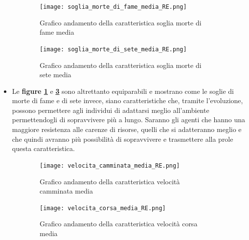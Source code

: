 \documentclass[11pt]{article}
\begin{document}
\newpage 

\begin{figure}[ht!]
	\hspace{-2mm}
	\begin{subfigure}{\textwidth}
         \centering
         \texttt{[image: soglia\_morte\_di\_fame\_media\_RE.png]}
         \caption{Grafico andamento della caratteristica soglia morte di fame media}
         \label{fig:morteFameRE}
	\end{subfigure}
	\begin{subfigure}{\textwidth}
		\centering
        \texttt{[image: soglia\_morte\_di\_sete\_media\_RE.png]}
        \caption{Grafico andamento della caratteristica soglia morte di sete media}
        \label{fig:morteSeteRE}
	\end{subfigure}
	\caption{}
\end{figure}



\begin{itemize}


    \item Le \textbf{figure \ref{fig:morteFameRE}} e \textbf{\ref{fig:morteSeteRE}} sono altrettanto equiparabili e mostrano come le soglie di morte di fame e di sete invece, siano caratteristiche che, tramite l'evoluzione, possono permettere agli individui di adattarsi meglio all'ambiente permettendogli di sopravvivere più a lungo. Saranno gli agenti che hanno una maggiore resistenza alle carenze di risorse, quelli che si adatteranno meglio e che quindi avranno più possibilità di sopravvivere e trasmettere alla prole questa caratteristica. 
    
\end{itemize}

\newpage 

\begin{figure}[ht!]
	\begin{subfigure}{\textwidth}
         \centering
         \texttt{[image: velocita\_camminata\_media\_RE.png]}
         \caption{Grafico andamento della caratteristica velocità camminata media}
         \label{fig:camminataRE}
	\end{subfigure}
	\begin{subfigure}{\textwidth}
		\centering
        \texttt{[image: velocita\_corsa\_media\_RE.png]}
        \caption{Grafico andamento della caratteristica velocità corsa media}
        \label{fig:corsaRE}
	\end{subfigure}
\caption{}
\end{figure}
\end{document}
